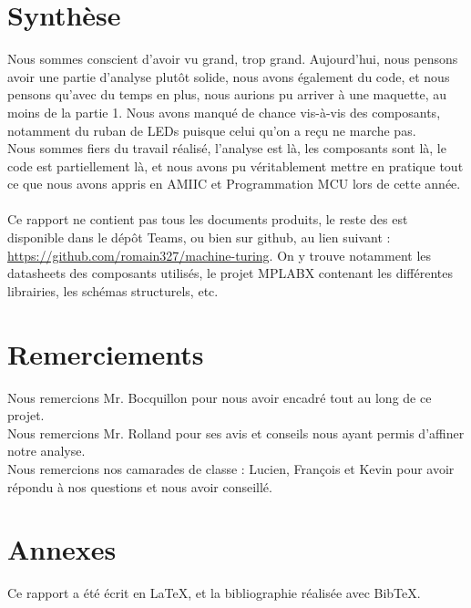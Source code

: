 \documentclass[12pt]{report}
\begin{document}
	\chapter{Synthèse}
	Nous sommes conscient d'avoir vu grand, trop grand. Aujourd'hui, nous pensons avoir une partie d'analyse plutôt solide, nous avons également du code, et nous pensons qu'avec du temps en plus, nous aurions pu arriver à une maquette, au moins de la partie 1. Nous avons manqué de chance vis-à-vis des composants, notamment du ruban de LEDs puisque celui qu'on a reçu ne marche pas.\\
	Nous sommes fiers du travail réalisé, l'analyse est là, les composants sont là, le code est partiellement là, et nous avons pu véritablement mettre en pratique tout ce que nous avons appris en AMIIC et Programmation MCU lors de cette année.\\
	\\
	Ce rapport ne contient pas tous les documents produits, le reste des est disponible dans le dépôt Teams, ou bien sur github, au lien suivant : \url{https://github.com/romain327/machine-turing}. On y trouve notamment les datasheets des composants utilisés, le projet MPLABX contenant les différentes librairies, les schémas structurels, etc.\\
	\chapter{Remerciements}
	Nous remercions Mr. Bocquillon pour nous avoir encadré tout au long de ce projet.\\
	Nous remercions Mr. Rolland pour ses avis et conseils nous ayant permis d'affiner notre analyse.\\
	Nous remercions nos camarades de classe : Lucien, François et Kevin pour avoir répondu à nos questions et nous avoir conseillé.\\
	\chapter{Annexes}
	Ce rapport a été écrit en LaTeX, et la bibliographie réalisée avec BibTeX.
\end{document}
